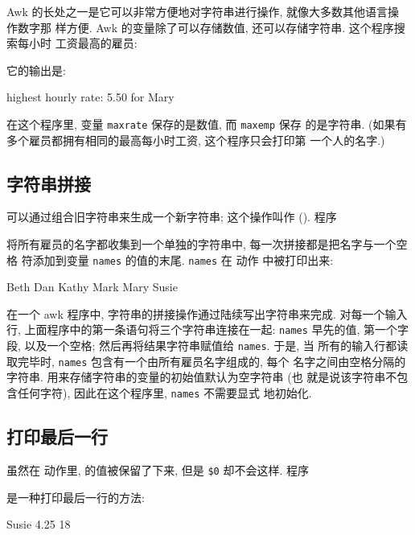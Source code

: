 Awk 的长处之一是它可以非常方便地对字符串进行操作, 就像大多数其他语言操
作数字那
样方便. Awk 的变量除了可以存储数值, 还可以存储字符串. 这个程序搜索每小时
工资最高的雇员:
它的输出是:
\begin{myverb}
    highest hourly rate: 5.50 for Mary
\end{myverb}
在这个程序里, 变量 \texttt{maxrate} 保存的是数值, 而 \texttt{maxemp} 保存
的是字符串. (如果有多个雇员都拥有相同的最高每小时工资, 这个程序只会打印第
一个人的名字.)

\subsection{字符串拼接}
\label{subsec:string_concatenation}

可以通过组合旧字符串来生成一个新字符串; 这个操作叫作
(). 程序
将所有雇员的名字都收集到一个单独的字符串中, 每一次拼接都是把名字与一个空格
符添加到变量 \texttt{names} 的值的末尾. \texttt{names} 在 \END 动作
中被打印出来:
\begin{myverb}
    Beth Dan Kathy Mark Mary Susie
\end{myverb}
在一个 awk 程序中, 字符串的拼接操作通过陆续写出字符串来完成. 对每一个输入行,
上面程序中的第一条语句将三个字符串连接在一起: \texttt{names} 早先的值,
第一个字段, 以及一个空格; 然后再将结果字符串赋值给 \texttt{names}. 于是, 当
所有的输入行都读取完毕时, \texttt{names} 包含有一个由所有雇员名字组成的,
每个
名字之间由空格分隔的字符串. 用来存储字符串的变量的初始值默认为空字符串 (也
就是说该字符串不包含任何字符), 因此在这个程序里, \texttt{names} 不需要显式
地初始化.

\subsection{打印最后一行}
\label{subsec:printing_the_last_input_line}

虽然在 \END 动作里, \nr 的值被保留了下来, 但是 \verb'$0' 却不会这样. 程序
是一种打印最后一行的方法:
\begin{myverb}
    Susie   4.25    18
\end{myverb}

